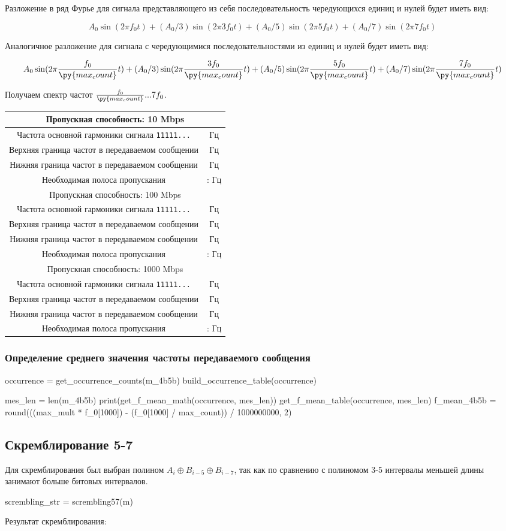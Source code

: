 \documentclass[12pt, a4paper]{article}
\newcommand{\bandwidthEntry}[2]{
  \hline
  \multicolumn{2}{|c|}{Пропускная способность: #1 Mbps} \\
  \hline
  Частота основной гармоники сигнала \texttt{11111...} & \py{int(f_0[#1] * #2)} Гц \\
  Верхняя граница частот в передаваемом сообщении & \py{int(max_mult * f_0[#1])} Гц \\
  Нижняя граница частот в передаваемом сообщении & \py{int(f_0[#1] / max_count)} Гц \\
  Необходимая полоса пропускания & \py{int(f_0[#1] / max_count)} : \py{int(max_mult * f_0[#1])} Гц \\
}
\begin{document}
Разложение в ряд Фурье для сигнала представляющего из себя последовательность
чередующихся единиц и нулей будет иметь вид:

$$A_0 \sin(2 \pi f_0 t) + (A_0 / 3) \sin(2 \pi 3 f_0 t) +
  (A_0 / 5) \sin(2 \pi 5 f_0 t) + (A_0 / 7) \sin(2 \pi 7 f_0 t)$$

Аналогичное разложение для сигнала с чередующимися последовательностями из
 единиц и нулей будет иметь вид:

$$A_0 \sin(2 \pi \frac{f_0}{\py{max_count}} t) + (A_0 / 3) \sin(2 \pi \frac{3 f_0}{\py{max_count}} t) +
  (A_0 / 5) \sin(2 \pi \frac{5 f_0}{\py{max_count}} t) + (A_0 / 7) \sin(2 \pi \frac{7 f_0}{\py{max_count}} t)$$

Получаем спектр частот $\frac{f_0}{\py{max_count}}...7 f_0$.

\begin{tabular}{| c | c |}
  \bandwidthEntry{10}{0}
  \bandwidthEntry{100}{0}
  \bandwidthEntry{1000}{0}
  \hline
\end{tabular}

\subsubsection*{Определение среднего значения чаcтоты передаваемого сообщения}

\begin{pycode}
occurrence = get_occurrence_counts(m_4b5b)
build_occurrence_table(occurrence)

mes_len = len(m_4b5b)
print(get_f_mean_math(occurrence, mes_len))
get_f_mean_table(occurrence, mes_len)
f_mean_4b5b = round(((max_mult * f_0[1000]) - (f_0[1000] / max_count)) / 1000000000, 2)
\end{pycode}

\subsection{Скремблирование 5-7}

Для скремблирования был выбран полином $A_i \oplus B_{i-5} \oplus B_{i-7}$,
так как по сравнению с полиномом 3-5 интервалы меньшей длины занимают больше
битовых интервалов.

\begin{pycode}
scrembling_str = scrembling57(m)
\end{pycode}

Результат скремблирования:\\
\end{document}
